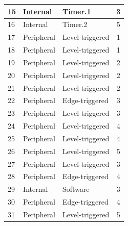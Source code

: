 \begin{longtable}[c]{ |l|l|l|c| }
    15  & Internal      & Timer.1           & 3                 \\
    \hline
    16  & Internal      & Timer.2           & 5                 \\
    \hline
    17  & Peripheral    & Level-triggered   & 1                 \\
    \hline
    18  & Peripheral    & Level-triggered   & 1                 \\
    \hline
    19  & Peripheral    & Level-triggered   & 2                 \\
    \hline
    20  & Peripheral    & Level-triggered   & 2                 \\
    \hline
    21  & Peripheral    & Level-triggered   & 2                 \\
    \hline
    22  & Peripheral    & Edge-triggered    & 3                 \\
    \hline
    23  & Peripheral    & Level-triggered   & 3                 \\
    \hline
    24  & Peripheral    & Level-triggered   & 4                 \\
    \hline
    25  & Peripheral    & Level-triggered   & 4                 \\
    \hline
    26  & Peripheral    & Level-triggered   & 5                 \\
    \hline
    27  & Peripheral    & Level-triggered   & 3                 \\
    \hline
    28  & Peripheral    & Edge-triggered    & 4                 \\
    \hline
    29  & Internal    & Software          & 3                 \\
    \hline
    30  & Peripheral    & Edge-triggered    & 4                 \\
    \hline
    31  & Peripheral    & Level-triggered   & 5                 \\
    
\end{longtable}
